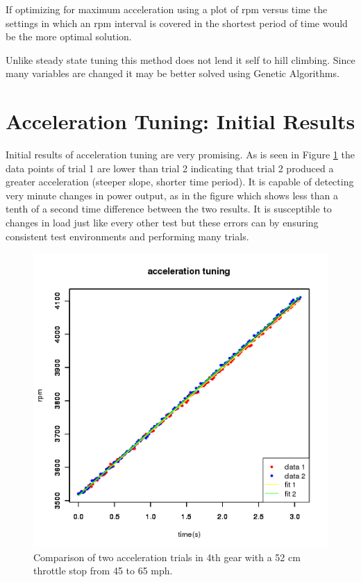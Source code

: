 \documentclass{article}
\begin{document}
If optimizing for maximum acceleration using a plot of rpm versus time
the settings in which an rpm interval is covered in the shortest period
of time would be the more optimal solution.

Unlike steady state tuning this method does not lend it self to hill climbing.
Since many variables are changed it may be better solved using Genetic Algorithms.

\section{Acceleration Tuning: Initial Results}
\label{sec:mair}

Initial results of acceleration tuning are very promising.
As is seen in Figure \ref{fig:atun1} the data points of trial 1 are
lower than trial 2 indicating that trial 2 produced a greater acceleration
(steeper slope, shorter time period).
It is capable of detecting very minute changes in power output,
as in the figure which shows less than a tenth of a second time difference
between the two results.
It is susceptible to changes in load just like every other test but these
errors can by ensuring consistent test environments and performing many trials.

\begin{figure}[!hbt]
\center
\includegraphics[scale=0.6]{msq-accel-4g_52cm_45-65mph-20110624-16:51:49-rtdata-single.png}
\caption{Comparison of two acceleration trials in 4th gear with a 52 cm throttle stop from 45 to 65 mph.}
\label{fig:atun1}
\end{figure}
\end{document}
